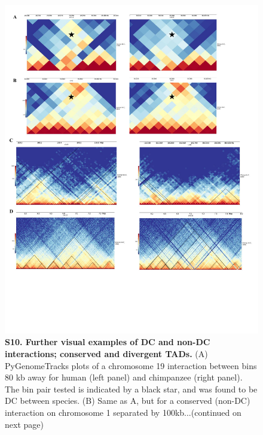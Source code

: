 \begin{figure}[!htb]
\centering
\includegraphics[width=6in]{img/figS10.1.pdf}
\caption[Further visual examples of DC and non-DC interactions; conserved and divergent TADs.]{\textbf{S10. Further visual examples of DC and non-DC interactions; conserved and divergent TADs.} (A) PyGenomeTracks plots \cite{Ramirez.2018} of a chromosome 19 interaction between bins 80 kb away for human (left panel) and chimpanzee (right panel). The bin pair tested is indicated by a black star, and was found to be DC between species. (B) Same as A, but for a conserved (non-DC) interaction on chromosome 1 separated by 100kb...(continued on next page)}
\label{fig:figS10}
\end{figure}

